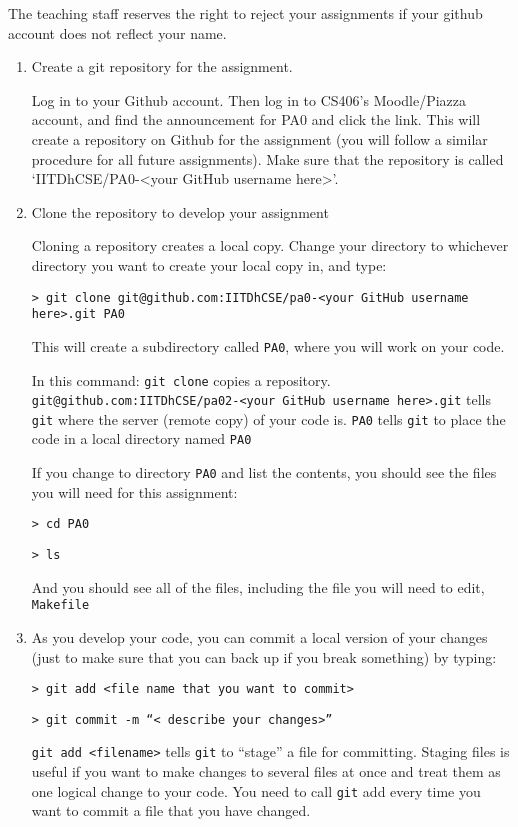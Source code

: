 \documentclass{article}
\begin{document}
The teaching staff reserves the right to reject your assignments if your github account does not reflect your name.
\begin{enumerate}
\item Create a git repository for the assignment.

Log in to your Github account. Then log in to CS406's Moodle/Piazza account, and find the announcement for PA0 and click the link. This will create a repository on Github for the assignment (you will follow a similar procedure for all future assignments). Make sure that the repository is called `IITDhCSE/PA0-<your GitHub username here>'.

\item Clone the repository to develop your assignment

Cloning a repository creates a local copy. Change your directory to whichever directory you want to create your local copy in, and type:

\texttt{> git clone git@github.com:IITDhCSE/pa0-<your GitHub username here>.git PA0}

This will create a subdirectory called \texttt{PA0}, where you will work on your code.

In this command: \texttt{git clone} copies a repository. \texttt{git@github.com:IITDhCSE/pa02-<your GitHub username here>.git} tells \texttt{git} where the server (remote copy) of your code is. \texttt{PA0} tells \texttt{git} to place the code in a local directory named \texttt{PA0}

If you change to directory \texttt{PA0} and list the contents, you should see the files you will need for this assignment:

\texttt{> cd PA0}

\texttt{> ls}

And you should see all of the files, including the file you will need to edit, \texttt{Makefile}

\item As you develop your code, you can commit a local version of your changes (just to make sure that you can back up if you break something) by typing:

\texttt{> git add <file name that you want to commit>}

\texttt{> git commit -m ``< describe your changes>''}

\texttt{git add <filename>} tells \texttt{git} to ``stage'' a file for committing. Staging files is useful if you want to make changes to several files at once and treat them as one logical change to your code. You need to call \texttt{git} add every time you want to commit a file that you have changed.


\end{enumerate}
\end{document}
